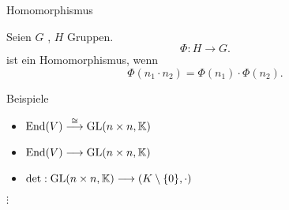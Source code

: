 \documentclass[class=article, crop=false]{standalone}
\begin{document}
\begin{zettel}{Homomorphismus}
\begin{flashcard}
    \begin{definition}[Homomorphismus]

        Seien $G$ , $H$ Gruppen.
\[
    \Phi: H \longrightarrow G
.\]
ist ein Homomorphismus, wenn
\[
    \Phi (n_1 \cdot n_2 ) = \Phi (n_1) \cdot \Phi (n_2)
.\]
    
\end{definition}
\end{flashcard}

\begin{example}[Homomorphismen]
Beispiele
    \begin{itemize}
        \item $\operatorname{End}(V) \stackrel{\cong}{\longrightarrow}  \operatorname{GL}(n \times n,\mathbb{K}) $ 
        \item $\operatorname{End}(V) \longrightarrow  \operatorname{GL}(n \times n,\mathbb{K}) $ 
        \item $ \det: \GL(n \times n,\K) \longrightarrow (K \setminus \set{0},\cdot )$ 
    \end{itemize}
    $\vdots$
    
\end{example}

\end{zettel}
\end{document}
